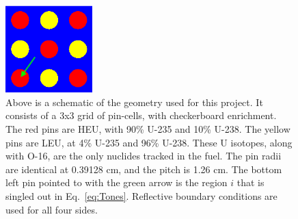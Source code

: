 \documentclass[10pt]{article}
\begin{document}
    
 \begin{figure}
    \begin{center}
      \includegraphics[width=0.3\textwidth]{full_3x3}
      \caption{Above is a schematic of the geometry used for this project. It consists of a 3x3 grid of pin-cells, with checkerboard enrichment. The red pins are HEU, with 90\% U-235 and 10\% U-238. The yellow pins are LEU, at 4\% U-235 and 96\% U-238. These U isotopes, along with O-16, are the only nuclides tracked in the fuel. The pin radii are identical at 0.39128 cm, and the pitch is 1.26 cm. The bottom left pin pointed to with the green arrow is the region $i$ that is singled out in Eq.~\ref{eq:Tones}. Reflective boundary conditions are used for all four sides.}
      \label{fig:geometry}
    \end{center}
\end{figure}
\end{document}
